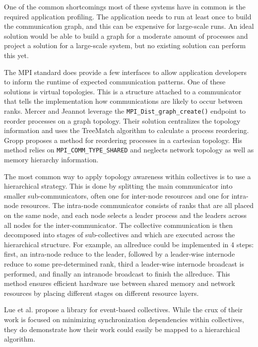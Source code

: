 One of the common shortcomings most of these systems have in common is the required application profiling.
The application needs to run at least once to build the communication graph, and this can be expensive for large-scale runs. 
An ideal solution would be able to build a graph for a moderate amount of processes and project a solution for a large-scale system, but no existing solution can perform this yet. 

The MPI standard does provide a few interfaces to allow application developers to inform the runtime of expected communication patterns.  
One of these solutions is virtual topologies. 
This is a structure attached to a communicator that tells the implementation how communications are likely to occur between ranks.
Mercer and Jeannot \cite{Mercer2011ImprvMPIWithRR} leverage the \texttt{MPI\_Dist\_graph\_create()} endpoint to reorder processes on a graph topology.
Their solution centralizes the topology information and uses the TreeMatch algorithm \cite{Jeannot2010TreeMatch} to calculate a process reordering.
Gropp \cite{Gropp2019CartTopoMapping} proposes a method for reordering processes in a cartesian topology.
His method relies on \texttt{MPI\_COMM\_TYPE\_SHARED} and neglects network topology as well as memory hierarchy information.

The most common way to apply topology awareness within collectives is to use a hierarchical strategy.
This is done by splitting the main communicator into smaller sub-communicators, often one for inter-node resources and one for intra-node resources.
The intra-node communicator consists of ranks that are all placed on the same node, and each node selects a leader process and the leaders across all nodes for the inter-communicator.
The collective communication is then decomposed into stages of sub-collectives and  which are executed across the hierarchical structure.
For example, an allreduce could be implemented in 4 steps: first, an intra-node reduce to the leader, followed by a leader-wise internode reduce to some pre-determined rank, third a leader-wise internode broadcast is performed, and finally an intranode broadcast to finish the allreduce.
This method ensures efficient hardware use between shared memory and network resources by placing different stages on different resource layers.

Lue et al. \cite{Luo2018ADAPT} propose a library for event-based collectives.
While the crux of their work is focused on minimizing synchronization dependencies within collectives, they do demonstrate how their work could easily be mapped to a hierarchical algorithm.

